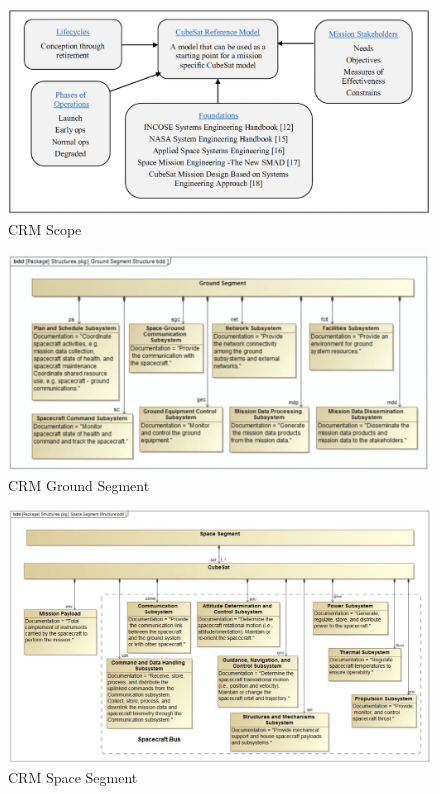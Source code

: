 \begin{figure}[!h]
    \centering
    \includegraphics[width=\textwidth]{Thesis/Literature_Review/Lit Review Figures/CubeSat RA scope.png}
    \caption{CRM Scope}
    \label{fig:CRM RA Scope}
\end{figure}


\begin{figure}[!h]
    \centering
    \includegraphics[width=\textwidth]{Thesis/Literature_Review/Lit Review Figures/CubeSat Ground Segment.png}
    \caption{CRM Ground Segment}
    \label{fig:CRM Ground Segment}
\end{figure}

\begin{figure}[!h]
    \centering
    \includegraphics[width=\textwidth]{Thesis/Literature_Review/Lit Review Figures/CubeSat RA Space Segment.png}
    \caption{CRM Space Segment}
    \label{fig:CRM Space Segment}
\end{figure}


